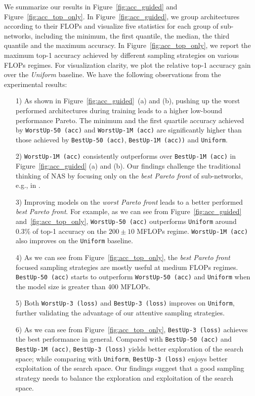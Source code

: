 \documentclass[final]{cvpr}
\theoremstyle{definition}
\begin{document}
We summarize our results in Figure~\ref{fig:acc_guided} and Figure~\ref{fig:acc_top_only}. 
In Figure~\ref{fig:acc_guided}, 
we group architectures according to their FLOPs 
and visualize five statistics for each group of sub-networks, including the minimum, the first quantile, the median, the third quantile and the maximum accuracy.
In Figure~\ref{fig:acc_top_only},
we report the maximum top-1 accuracy achieved by different sampling strategies on various FLOPs regimes. 
For visualization clarity, we plot the relative top-1 accuracy gain over the \textit{Uniform} baseline. 
We have the following observations from the experimental results:
\begin{itemize}
    \item[1)] As shown in Figure~\ref{fig:acc_guided}~(a) and (b),
    pushing up the worst performed architectures
    during training leads to a higher low-bound performance Pareto. 
    The minimum and the first quartile accuracy achieved by  \texttt{WorstUp-50 (acc)} and \texttt{WorstUp-1M (acc)} are significantly higher than those achieved by \texttt{BestUp-50 (acc)}, \texttt{BestUp-1M (acc))} and \texttt{Uniform}. 
    \item[2)] \texttt{WorstUp-1M (acc)} consistently outperforms over \texttt{BestUp-1M (acc)} in Figure~\ref{fig:acc_guided} (a) and (b). Our findings challenge the traditional thinking of NAS by focusing only on the \emph{best Pareto front} of sub-networks, e.g., in \cite{liu2018darts, cai2018proxylessnas}.
\item[3)] Improving models on the \emph{worst Pareto front} leads to a better performed \emph{best Pareto front}.  For example, as we can see from Figure~\ref{fig:acc_guided} and~\ref{fig:acc_top_only}, \texttt{WorstUp-50 (acc)} outperforms \texttt{Uniform} around 0.3\% of top-1 accuracy on the $200\pm10$ MFLOPs regime. \texttt{WorstUp-1M (acc)} also improves on the \texttt{Uniform} baseline. 
    \item[4)] As we can see from Figure~\ref{fig:acc_top_only}, the \emph{best Pareto front} focused sampling strategies are mostly useful at medium FLOPs regimes. \texttt{BestUp-50 (acc)} starts to outperform \texttt{WorstUp-50 (acc)}  and \texttt{Uniform} when the model size is greater than 400 MFLOPs. 
    \item[5)] Both \texttt{WorstUp-3 (loss)} and \texttt{BestUp-3 (loss)} improves on \texttt{Uniform}, further validating the advantage of our attentive sampling strategies. 
    \item[6)] As we can see from Figure~\ref{fig:acc_top_only}, \texttt{BestUp-3 (loss)} achieves the best performance in general. Compared with \texttt{BestUp-50 (acc)} and \texttt{BestUp-1M (acc)}, \texttt{BestUp-3 (loss)} yields better exploration of the search space; while comparing with \texttt{Uniform}, \texttt{BestUp-3 (loss)} enjoys better exploitation of the search space. Our findings suggest that a good sampling strategy needs to balance the exploration  and exploitation of the search space.  
\end{itemize}
 
\end{document}
